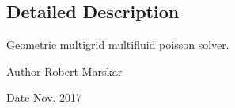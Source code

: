\subsection{Detailed Description}
Geometric multigrid multifluid poisson solver. 

\begin{DoxyAuthor}{Author}
Robert Marskar 
\end{DoxyAuthor}
\begin{DoxyDate}{Date}
Nov. 2017 
\end{DoxyDate}
